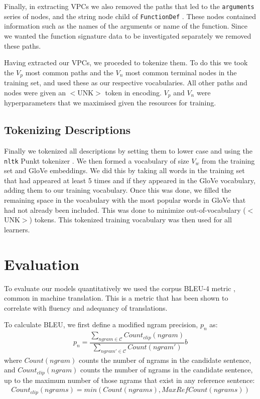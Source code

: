 Finally, in extracting VPCs we also removed the paths that led to the \texttt{arguments} series of nodes, and the string node child of \texttt{FunctionDef} . These nodes contained information such as the names of the arguments or name of the function. Since we wanted the function signature data to be investigated separately we removed these paths. 

Having extracted our VPCs, we proceded to tokenize them. To do this we took the $V_p$ most common paths and the $V_n$ most common terminal nodes in the training set, and used these as our respective vocabularies.  All other paths and nodes were given an $<$UNK$>$ token in encoding. $V_p$ and $V_n$ were hyperparameters that we maximised given the resources for training.

\subsection{Tokenizing Descriptions}
\label{sub:tokenize_descriptions}

Finally we tokenized all descriptions by setting them to lower case and using the \texttt{nltk} \citep{bird_natural_2009} Punkt tokenizer \citep{Kiss:2006:UMS:1245119.1245122}. We then formed a vocabulary of size $V_w$ from the training set and GloVe embeddings. We did this by taking all words in the training set that had appeared at least 5 times and if they appeared in the GloVe vocabulary, adding them to our training vocabulary. Once this was done, we filled the remaining space in the vocabulary with the most popular words in GloVe that had not already been included. This was done to minimize out-of-vocabulary ($<$UNK$>$) tokens. This tokenized training vocabulary was then used for all learners.

\section{Evaluation}

To evaluate our models quantitatively we used the corpus BLEU-4 metric \citep{papineni_bleu_2001}, common in machine translation. This is a metric that has been shown to correlate with fluency and adequancy of translations. 

To calculate BLEU, we first define a modified ngram precision, $p_n$ as:
\begin{align}
    p_n = \dfrac{\sum_{ngram \in \mathcal{C}} Count_{clip}(ngram)}{\sum_{ngram' \in \mathcal{C}} Count(ngram')} \nonumber b
\end{align}
where $Count(ngram)$ counts the number of ngrams in the candidate sentence, and  $Count_{clip}(ngram)$ counts the number of ngrams in the candidate sentence, up to the maximum number of those ngrams that exist in any reference sentence:
\begin{align}
Count_{clip}(ngrams) = min(Count(ngrams),MaxRefCount(ngrams)) \nonumber
\end{align}

